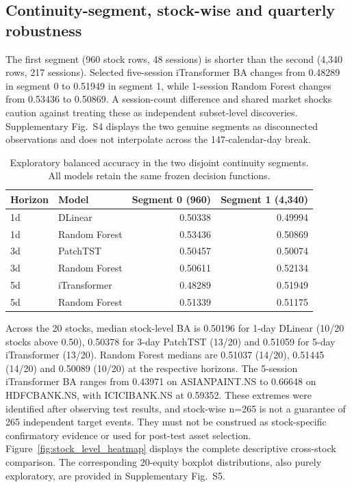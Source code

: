 \documentclass[fleqn,10pt]{wlscirep}
\begin{document}
\subsection{Continuity-segment, stock-wise and quarterly robustness}
The first segment (960 stock rows, 48 sessions) is shorter than the second (4,340 rows, 217 sessions). Selected five-session iTransformer BA changes from 0.48289 in segment 0 to 0.51949 in segment 1, while 1-session Random Forest changes from 0.53436 to 0.50869. A session-count difference and shared market shocks caution against treating these as independent subset-level discoveries. Supplementary Fig.~S4 displays the two genuine segments as disconnected observations and does not interpolate across the 147-calendar-day break.

\begin{table}[htbp]\centering\small
\caption{Exploratory balanced accuracy in the two disjoint continuity segments. All models retain the same frozen decision functions.}\label{tab:segments}
\begin{tabular}{@{}llrr@{}}\toprule
Horizon & Model & Segment 0 (960) & Segment 1 (4,340) \\ \midrule
1d & DLinear & 0.50338 & 0.49994 \\
1d & Random Forest & 0.53436 & 0.50869 \\
3d & PatchTST & 0.50457 & 0.50074 \\
3d & Random Forest & 0.50611 & 0.52134 \\
5d & iTransformer & 0.48289 & 0.51949 \\
5d & Random Forest & 0.51339 & 0.51175 \\
\bottomrule\end{tabular}
\end{table}

Across the 20 stocks, median stock-level BA is 0.50196 for 1-day DLinear (10/20 stocks above 0.50), 0.50378 for 3-day PatchTST (13/20) and 0.51059 for 5-day iTransformer (13/20). Random Forest medians are 0.51037 (14/20), 0.51445 (14/20) and 0.50089 (10/20) at the respective horizons. The 5-session iTransformer BA ranges from 0.43971 on ASIANPAINT.NS to 0.66648 on HDFCBANK.NS, with ICICIBANK.NS at 0.59352. These extremes were identified after observing test results, and stock-wise n=265 is not a guarantee of 265 independent target events. They must not be construed as stock-specific confirmatory evidence or used for post-test asset selection. Figure~\ref{fig:stock_level_heatmap} displays the complete descriptive cross-stock comparison. The corresponding 20-equity boxplot distributions, also purely exploratory, are provided in Supplementary Fig.~S5.
\end{document}
